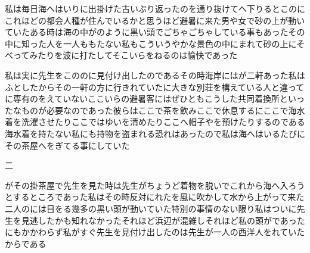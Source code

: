 \documentclass[a4j,twocolumn]{tarticle}
\begin{document}
私は毎日海へはいりに出掛けた\。古いぶり返ったのを通り抜けてへ下りると\、このにこれほどの都会人種が住んでいるかと思うほど\、避暑に来た男や女で砂の上が動いていた\。ある時は海の中がのように黒い頭でごちゃごちゃしている事もあった\。その中に知った人を一人ももたない私も\、こういうやかな景色の中にまれて\、砂の上にそべってみたり\、を波に打たしてそこいらをねるのは愉快であった\。

私は実に先生をこののに見付け出したのである\。その時海岸にはが二軒あった\。私はふとしたからその一軒の方に行きれていた\。に大きな別荘を構えている人と違って\、に専有のをえていないここいらの避暑客には\、ぜひともこうした共同着換所といったなものが必要なのであった\。彼らはここで茶を飲み\、ここで休息するに\、ここで海水着を洗濯させたり\、ここではゆいを清めたり\、ここへ帽子やを預けたりするのである\。海水着を持たない私にも持物を盗まれる恐れはあったので\、私は海へはいるたびにその茶屋へをぎてる事にしていた\。

二

がその掛茶屋で先生を見た時は\、先生がちょうど着物を脱いでこれから海へ入ろうとするところであった\。私はその時反対にれたを風に吹かして水から上がって来た\。二人のには目をる幾多の黒い頭が動いていた\。特別の事情のない限り\、私はついに先生を見逃したかも知れなかった\。それほど浜辺が混雑し\、それほど私の頭がであったにもかかわらず\、私がすぐ先生を見付け出したのは\、先生が一人の西洋人をれていたからである\。
\end{document}
